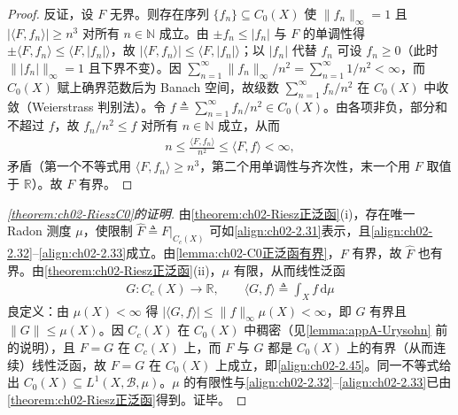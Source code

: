 \documentclass[../../main.tex]{subfiles}%
\begin{document}
\begin{proof}
反证，设 $F$ 无界。则存在序列 $\{f_n\}\subseteq C_0(X)$ 使 $\|f_n\|_\infty=1$ 且 $\left|\langle F,f_n\rangle\right|\geqslant n^3$ 对所有 $n\in\mathbb N$ 成立。由 $\pm f_n\leqslant|f_n|$ 与 $F$ 的单调性得 $\pm\langle F,f_n\rangle\leqslant\langle F,|f_n|\rangle$，故 $\left|\langle F,f_n\rangle\right|\leqslant\langle F,|f_n|\rangle$；以 $|f_n|$ 代替 $f_n$ 可设 $f_n\geqslant0$（此时 $\||f_n|\|_\infty=1$ 且下界不变）。因 $\sum_{n=1}^\infty\|f_n\|_\infty/n^2=\sum_{n=1}^\infty1/n^2<\infty$，而 $C_0(X)$ 赋上确界范数后为 Banach 空间，故级数 $\sum_{n=1}^\infty f_n/n^2$ 在 $C_0(X)$ 中收敛（Weierstrass 判别法）。令 $f\triangleq\sum_{n=1}^\infty f_n/n^2\in C_0(X)$。由各项非负，部分和不超过 $f$，故 $f_n/n^2\leqslant f$ 对所有 $n\in\mathbb N$ 成立，从而
\begin{align*}
n\leqslant\frac{\langle F,f_n\rangle}{n^2}\leqslant\langle F,f\rangle<\infty,
\end{align*}
矛盾（第一个不等式用 $\langle F,f_n\rangle\geqslant n^3$，第二个用单调性与齐次性，末一个用 $F$ 取值于 $\mathbb R$）。故 $F$ 有界。
\end{proof}

\begin{proof}[\cref{theorem:ch02-RieszC0}的证明]
由\cref{theorem:ch02-Riesz正泛函}(i)，存在唯一 Radon 测度 $\mu$，使限制 $\hat F\triangleq F|_{C_c(X)}$ 可如\eqref{align:ch02-2.31}表示，且\eqref{align:ch02-2.32}--\eqref{align:ch02-2.33}成立。由\cref{lemma:ch02-C0正泛函有界}，$F$ 有界，故 $\hat F$ 也有界。由\cref{theorem:ch02-Riesz正泛函}(ii)，$\mu$ 有限，从而线性泛函
\begin{align*}
G:C_c(X)\to\mathbb R,\qquad\langle G,f\rangle\triangleq\int_Xf\,\mathrm{d}\mu
\end{align*}
良定义：由 $\mu(X)<\infty$ 得 $\left|\langle G,f\rangle\right|\leqslant\|f\|_\infty\mu(X)<\infty$，即 $G$ 有界且 $\|G\|\leqslant\mu(X)$。因 $C_c(X)$ 在 $C_0(X)$ 中稠密（见\cref{lemma:appA-Urysohn} 前的说明），且 $F=G$ 在 $C_c(X)$ 上，而 $F$ 与 $G$ 都是 $C_0(X)$ 上的有界（从而连续）线性泛函，故 $F=G$ 在 $C_0(X)$ 上成立，即\eqref{align:ch02-2.45}。同一不等式给出 $C_0(X)\subseteq L^1(X,\mathscr B,\mu)$。$\mu$ 的有限性与\eqref{align:ch02-2.32}--\eqref{align:ch02-2.33}已由\cref{theorem:ch02-Riesz正泛函}得到。证毕。
\end{proof}
\end{document}

